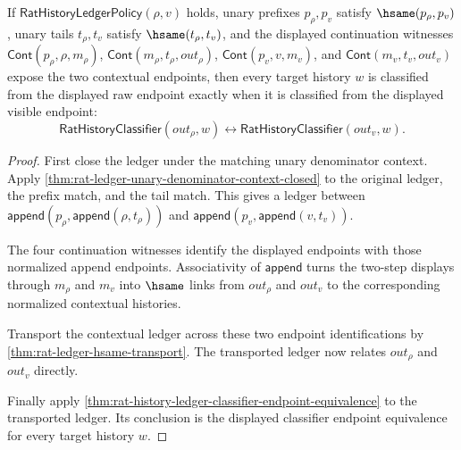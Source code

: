 \begin{theorem}
\label{thm:rat-history-ledger-cont-unary-context-classifier-endpoint-equivalence}
If $\mathsf{RatHistoryLedgerPolicy}(\rho,v)$ holds, unary prefixes
$p_\rho,p_v$ satisfy $\hsame(p_\rho,p_v)$, unary tails $t_\rho,t_v$ satisfy
$\hsame(t_\rho,t_v)$, and the displayed continuation witnesses
$\mathsf{Cont}(p_\rho,\rho,m_\rho)$,
$\mathsf{Cont}(m_\rho,t_\rho,out_\rho)$,
$\mathsf{Cont}(p_v,v,m_v)$, and
$\mathsf{Cont}(m_v,t_v,out_v)$ expose the two contextual endpoints, then
every target history $w$ is classified from the displayed raw endpoint exactly
when it is classified from the displayed visible endpoint:
$$
\mathsf{RatHistoryClassifier}(out_\rho,w)\leftrightarrow
\mathsf{RatHistoryClassifier}(out_v,w).
$$
\end{theorem}
\begin{proof}
First close the ledger under the matching unary denominator context. Apply
\autoref{thm:rat-ledger-unary-denominator-context-closed} to the original
ledger, the prefix match, and the tail match. This gives a ledger between
$\mathsf{append}(p_\rho,\mathsf{append}(\rho,t_\rho))$ and
$\mathsf{append}(p_v,\mathsf{append}(v,t_v))$.

The four continuation witnesses identify the displayed endpoints with those
normalized append endpoints. Associativity of $\mathsf{append}$ turns the
two-step displays through $m_\rho$ and $m_v$ into $\hsame$ links from
$out_\rho$ and $out_v$ to the corresponding normalized contextual histories.

Transport the contextual ledger across these two endpoint identifications by
\autoref{thm:rat-ledger-hsame-transport}. The transported ledger now relates
$out_\rho$ and $out_v$ directly.

Finally apply
\autoref{thm:rat-history-ledger-classifier-endpoint-equivalence} to the
transported ledger. Its conclusion is the displayed classifier endpoint
equivalence for every target history $w$.
\end{proof}

